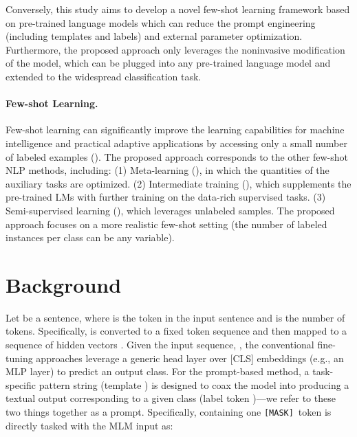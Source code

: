 \documentclass{article} \usepackage{iclr2022_conference,times}
\newcommand{\mask}{\texttt{[MASK]}}
\begin{document}
Conversely, this study aims to develop a novel few-shot learning framework based on pre-trained language models which can reduce the prompt engineering (including templates and labels) and external parameter optimization. 
Furthermore, the proposed approach only leverages the noninvasive modification of the model, which can be plugged into any pre-trained language model and extended to the widespread classification task. 

\paragraph{Few-shot Learning.}
Few-shot learning can significantly improve the learning capabilities for machine intelligence and practical adaptive applications by accessing only a small number of labeled examples (\cite{DBLP:conf/www/ZhangDSCZC20}). 
The proposed approach corresponds to the other few-shot NLP methods, including: 
(1) Meta-learning (\cite{DBLP:conf/naacl/YuGYCPCTWZ18,DBLP:conf/iclr/BaoWCB20,DBLP:conf/coling/BansalJM20,DBLP:conf/aaai/DengZSCC20,DBLP:conf/wsdm/DengZKZZC20,DBLP:conf/coling/YuZDYZC20}), in which the quantities of the auxiliary tasks are optimized. 
(2) Intermediate training (\cite{DBLP:journals/corr/abs-1811-01088,DBLP:conf/emnlp/YinRRSX20}), which supplements the pre-trained LMs with further training on the data-rich supervised tasks.
(3) Semi-supervised learning (\cite{DBLP:conf/iclr/MiyatoDG17,DBLP:conf/nips/XieDHL020}), which leverages unlabeled samples. 
The proposed approach focuses on a more realistic few-shot setting (the number of labeled instances per class can be any variable).

\section{Background}
Let  be a sentence, where  is the  token in the input sentence and  is the number of tokens. 
Specifically,  is converted to a fixed token sequence  and then mapped to a sequence of hidden vectors . 
Given the input sequence, , the conventional fine-tuning approaches leverage a generic head layer over [CLS] embeddings (e.g., an MLP layer) to predict an output class. 
For the prompt-based method, a task-specific pattern string (template ) is designed to coax the model into producing a textual output corresponding to a given class (label token )---we refer to these two things together as a prompt.
Specifically,  containing one \mask~token is directly tasked with the MLM input as:
\end{document}
